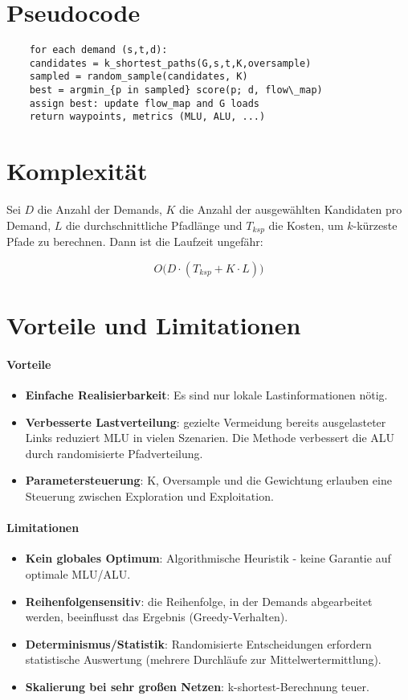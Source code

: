 \section{Pseudocode}
\begin{verbatim}
    for each demand (s,t,d):
    candidates = k_shortest_paths(G,s,t,K,oversample)
    sampled = random_sample(candidates, K)
    best = argmin_{p in sampled} score(p; d, flow\_map)
    assign best: update flow_map and G loads
    return waypoints, metrics (MLU, ALU, ...)
\end{verbatim}


\section{Komplexität}

Sei $D$ die Anzahl der Demands, $K$ die Anzahl der ausgewählten Kandidaten pro Demand, $L$ die durchschnittliche Pfadlänge und $T_{ksp}$ die Kosten, um $k$-kürzeste Pfade zu berechnen. Dann ist die Laufzeit ungefähr:

$$
O\bigl(D\cdot (T_{ksp} + K\cdot L)\bigr)
$$


\section{Vorteile und Limitationen}
\paragraph{Vorteile}
\begin{itemize}
    \item \textbf{Einfache Realisierbarkeit}: Es sind nur lokale Lastinformationen nötig.
    \item \textbf{Verbesserte Lastverteilung}: gezielte Vermeidung bereits ausgelasteter Links reduziert MLU in vielen Szenarien. Die Methode verbessert die ALU durch randomisierte Pfadverteilung.
    \item \textbf{Parametersteuerung}: K, Oversample und die Gewichtung erlauben eine Steuerung zwischen Exploration und Exploitation.
\end{itemize}

\paragraph{Limitationen}
\begin{itemize}
    \item \textbf{Kein globales Optimum}: Algorithmische Heuristik - keine Garantie auf optimale MLU/ALU.
    \item \textbf{Reihenfolgensensitiv}: die Reihenfolge, in der Demands abgearbeitet werden, beeinflusst das Ergebnis (Greedy-Verhalten).
    \item \textbf{Determinismus/Statistik}: Randomisierte Entscheidungen erfordern statistische Auswertung (mehrere Durchläufe zur Mittelwertermittlung).
    \item \textbf{Skalierung bei sehr großen Netzen}: k-shortest-Berechnung teuer.
\end{itemize}

